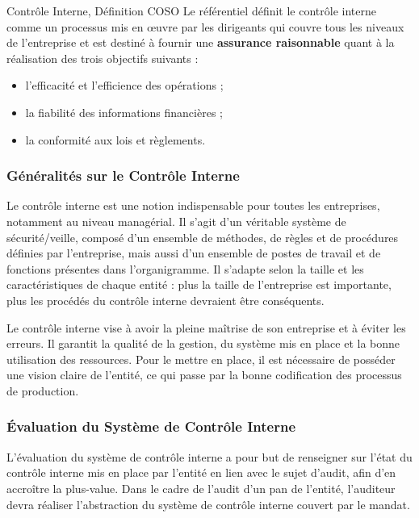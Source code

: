 \begin{boxdef}{Contrôle Interne, Définition COSO}
Le référentiel  définit le contrôle interne comme un processus mis en
œuvre par les dirigeants qui couvre tous les niveaux de l'entreprise et est destiné à
fournir une \textbf{assurance raisonnable} quant à la réalisation des trois objectifs
suivants :
\begin{itemize}
  \item l'efficacité et l'efficience des opérations ;
  \item la fiabilité des informations financières ;
  \item la conformité aux lois et règlements.
\end{itemize}
\end{boxdef}

\subsubsection{Généralités sur le Contrôle Interne}

Le contrôle interne est une notion indispensable pour toutes les entreprises,
notamment au niveau managérial. Il s'agit d'un véritable système de sécurité/veille,
composé d'un ensemble de méthodes, de règles et de procédures définies par
l'entreprise, mais aussi d'un ensemble de postes de travail et de fonctions présentes
dans l'organigramme. Il s'adapte selon la taille et les caractéristiques de chaque
entité : plus la taille de l'entreprise est importante, plus les procédés du contrôle
interne devraient être conséquents.

Le contrôle interne vise à avoir la pleine maîtrise de son entreprise et à éviter les
erreurs. Il garantit la qualité de la gestion, du système mis en place et la bonne
utilisation des ressources. Pour le mettre en place, il est nécessaire de posséder une
vision claire de l'entité, ce qui passe par la bonne codification des processus de
production.

\subsubsection{Évaluation du Système de Contrôle Interne}

L'évaluation du système de contrôle interne a pour but de renseigner sur l'état du
contrôle interne mis en place par l'entité en lien avec le sujet d'audit, afin d'en
accroître la plus-value. Dans le cadre de l'audit d'un pan de l'entité, l'auditeur
devra réaliser l'abstraction du système de contrôle interne couvert par le mandat.

